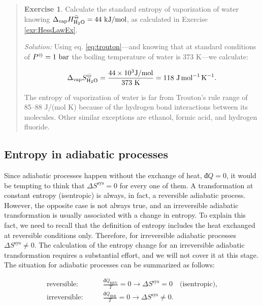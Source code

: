 \documentclass[
  9pt,
]{extbook}
\theoremstyle{definition}
\theoremstyle{definition}
\theoremstyle{definition}
\newtheorem{exercise}{Exercise}[chapter]
\theoremstyle{definition}
\theoremstyle{remark}
\begin{document}
\begin{quote}
\begin{exercise}
\protect\hypertarget{exr:troutonex}{}\label{exr:troutonex}Calculate the standard entropy of vaporization of water knowing \(\Delta_{\mathrm{vap}} H_{\mathrm{H}_2\mathrm{O}}^{-\kern-6pt{\ominus}\kern-6pt-}= 44 \  \text{kJ/mol}\), as calculated in Exercise \ref{exr:HessLawEx}.

\emph{Solution:} Using eq. \eqref{eq:trouton}---and knowing that at standard conditions of \(P^{-\kern-6pt{\ominus}\kern-6pt-}= 1 \  \text{bar}\) the boiling temperature of water is 373 K---we calculate:

\begin{equation}
\Delta_{\mathrm{vap}} S_{\mathrm{H}_2\mathrm{O}}^{-\kern-6pt{\ominus}\kern-6pt-}= \frac{44 \times 10^3 \text{J/mol}}{373 \ \text{K}} = 118 \  \text{J} \, \text{mol}^{-1} \, \text{K}^{-1}.
\label{eq:trouton1}
\end{equation}

The entropy of vaporization of water is far from Trouton's rule range of 85--88 J/(mol K) because of the hydrogen bond interactions between its molecules. Other similar exceptions are ethanol, formic acid, and hydrogen fluoride.
\end{exercise}
\end{quote}

\subsection{Entropy in adiabatic processes}\label{entropy-in-adiabatic-processes}

Since adiabatic processes happen without the exchange of heat, \(đQ=0\), it would be tempting to think that \(\Delta S^{\mathrm{sys}} = 0\) for every one of them. A transformation at constant entropy (isentropic) is always, in fact, a reversible adiabatic process. However, the opposite case is not always true, and an irreversible adiabatic transformation is usually associated with a change in entropy. To explain this fact, we need to recall that the definition of entropy includes the heat exchanged at reversible conditions only. Therefore, for irreversible adiabatic processes \(\Delta S^{\mathrm{sys}} \neq 0\). The calculation of the entropy change for an irreversible adiabatic transformation requires a substantial effort, and we will not cover it at this stage. The situation for adiabatic processes can be summarized as follows:

\begin{equation}
\begin{aligned}
\text{reversible:} \qquad & \frac{đQ_{\mathrm{REV}}}{T} = 0 \longrightarrow \Delta S^{\mathrm{sys}} = 0 \quad \text{(isentropic),}\\
\text{irreversible:} \qquad & \frac{đQ_{\mathrm{IRR}}}{T}  = 0 \longrightarrow \Delta S^{\mathrm{sys}} \neq 0. \\
\end{aligned}
\label{eq:adiabaticent}
\end{equation}
\end{document}
